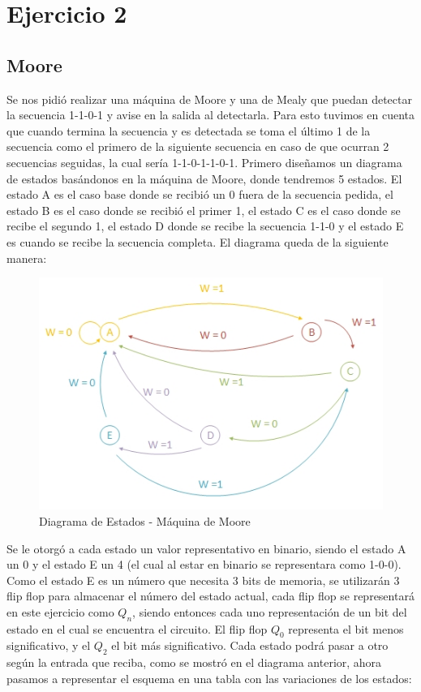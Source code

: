 \documentclass[10pt,a4paper]{article}
\begin{document}
\section{Ejercicio 2}

\subsection{Moore}
Se nos pidi\'o realizar una m\'aquina de Moore y una de Mealy que puedan detectar la secuencia 1-1-0-1 y avise en la salida al detectarla. Para esto tuvimos en cuenta que cuando termina la secuencia y es detectada se toma el \'ultimo 1 de la secuencia como el primero de la siguiente secuencia en caso de que ocurran 2 secuencias seguidas, la cual ser\'ia 1-1-0-1-1-0-1. Primero diseñamos un diagrama de estados basándonos en la m\'aquina de Moore, donde tendremos 5 estados. El estado A es el caso base donde se recibió un 0 fuera de la secuencia pedida, el estado B es el caso donde se recibió el primer 1, el estado C es el caso donde se recibe el segundo 1, el estado D donde se recibe la secuencia 1-1-0 y el estado E es cuando se recibe la secuencia completa. 
El diagrama queda de la siguiente manera:

\begin{figure}[hbtp]
	\centering
		\includegraphics[scale=1]{diagestmoore.jpg}
	\caption{Diagrama de Estados - Máquina de Moore}
	\label{2_fig0}
\end{figure}

Se le otorgó a cada estado un valor representativo en binario, siendo el estado A un 0 y el estado E un 4 (el cual al estar en binario se representara como 1-0-0). Como el estado E es un número que necesita 3 bits de memoria, se utilizar\'an 3 flip flop para almacenar el número del estado actual, cada flip flop se representar\'a en este ejercicio como $Q_n$, siendo entonces cada uno representación de un bit del estado en el cual se encuentra el circuito. El flip flop $Q_0$ representa el bit menos significativo, y el $Q_2$ el bit más significativo. Cada estado podr\'a pasar a otro seg\'un la entrada que reciba, como se mostr\'o en el diagrama anterior, ahora pasamos a representar el esquema en una tabla con las variaciones de los estados:
\end{document}
